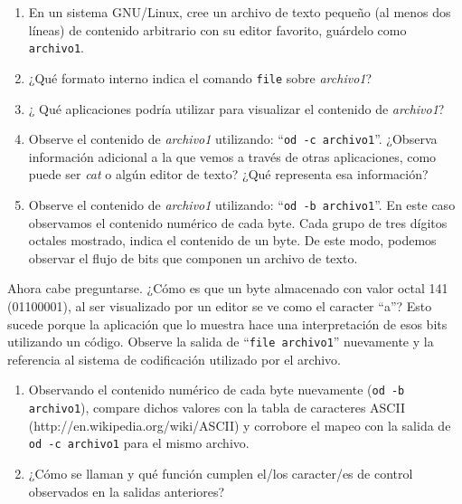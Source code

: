 \documentclass[12pt]{article}
\begin{document}
\begin{enumerate}

    \item En un sistema GNU/Linux, cree un archivo de texto pequeño (al menos
        dos líneas) de contenido arbitrario con su editor favorito, guárdelo
        como {\tt archivo1}.

    \item ¿Qué formato interno indica el comando {\tt file} sobre
        \emph{archivo1}? 

    \item ¿ Qué aplicaciones podría utilizar para visualizar el contenido de
        \emph{archivo1}?

    \item Observe el contenido de \emph{archivo1} utilizando: ``{\tt od -c
        archivo1}''. ¿Observa información adicional a la que vemos a través de
        otras aplicaciones, como puede ser \emph{cat} o algún editor de texto?
        ¿Qué representa esa información?

    \item Observe el contenido de \emph{archivo1} utilizando: ``{\tt od -b
        archivo1}''. En este caso observamos el contenido numérico de cada
        byte. Cada grupo de tres dígitos octales mostrado, indica el contenido
        de un byte. De este modo, podemos observar el flujo de bits que
        componen un archivo de texto.

\end{enumerate}

Ahora cabe preguntarse. ¿Cómo es que un byte almacenado con valor octal 141
(01100001), al ser visualizado por un editor se ve como el caracter ``a''?
Esto sucede porque la aplicación que lo muestra hace una interpretación de
esos bits utilizando un código. Observe la salida de ``{\tt file archivo1}''
nuevamente y la referencia al sistema de codificación utilizado por el
archivo. 

\begin{enumerate}

    \item Observando el contenido numérico de cada byte nuevamente ({\tt od -b
    archivo1}), compare dichos valores con la tabla de caracteres ASCII
    (http://en.wikipedia.org/wiki/ASCII) y corrobore el mapeo con la salida de
    {\tt od -c archivo1}  para el mismo archivo.

    \item ¿Cómo se llaman y qué función cumplen el/los caracter/es de control
    observados en la salidas anteriores? 

\end{enumerate}
\end{document}
